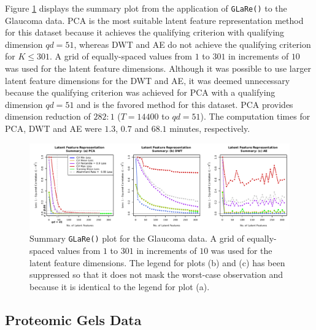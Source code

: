 Figure \ref{fig:eye-results} displays the summary plot from the application of \texttt{GLaRe()} to the Glaucoma data.
PCA is the most suitable latent feature representation method for this dataset because it achieves the qualifying criterion with qualifying dimension $qd=51$, whereas DWT and AE do not achieve the qualifying criterion for $K \leq 301$.
A grid of equally-spaced values from $1$ to $301$ in increments of $10$ was used for the latent feature dimensions.
Although it was possible to use larger latent feature dimensions for the DWT and AE, it was deemed unnecessary because the qualifying criterion was achieved for PCA with a qualifying dimension $qd=51$ and is the favored method for this dataset.
PCA provides dimension reduction of $282:1$ ($T = 14400$ to $qd = 51$).
The computation times for PCA, DWT and AE were $1.3$, $0.7$ and $68.1$ minutes, respectively.


\begin{figure}
    \centering
    \includegraphics[width=1\textwidth]{figures/eye-results.pdf}
    \caption{Summary \texttt{GLaRe()} plot for the Glaucoma data. A grid of equally-spaced values from $1$ to $301$ in increments of $10$ was used for the latent feature dimensions. 
    The legend for plots (b) and (c) has been suppressed so that it does not mask the worst-case observation and because it is identical to the legend for plot (a).}
    \label{fig:eye-results}
\end{figure}

\subsection{Proteomic Gels Data}

